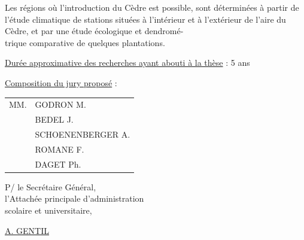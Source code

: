 Les régions où l'introduction du Cèdre est possible, sont déterminées à partir de l'étude climatique de stations situées à l'intérieur et à l'extérieur de l'aire du Cèdre, et par une étude écologique et dendromé-\\
trique comparative de quelques plantations.

\uline{Durée approximative des recherches ayant abouti à la thèse} : 5 ans

\uline{Composition du jury proposé} : \begin{tabular}[t]{ll}
MM. & GODRON M.\\
& BEDEL J.\\
& SCHOENENBERGER A.\\
& ROMANE F.\\
& DAGET Ph.
\end{tabular}

\begin{flushright}
P/ le Secrétaire Général,\\
l'Attachée principale d'administration\\
scolaire et universitaire,


\uline{A. GENTIL}
\end{flushright}


